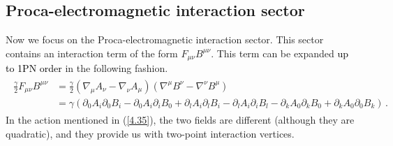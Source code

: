\subsection{Proca-electromagnetic interaction sector}
Now we focus on the Proca-electromagnetic interaction sector. This sector contains an interaction term of the form $F_{\mu\nu}B^{\mu\nu}$. This term can be expanded \textcolor{black}{up to 1PN order }in the following fashion.
\begin{align}
    \begin{split}
  \frac{\gamma}{2} F_{\mu\nu}B^{\mu\nu}&=\frac{\gamma}{2}(\nabla_\mu A_\nu-\nabla_\nu A_\mu)(\nabla^\mu B^\nu-\nabla^\nu B^\mu)\\ &
=\gamma(\partial_0A_i\partial_0B_i-\partial_0A_i\partial_iB_0+\partial_lA_i\partial_lB_i-\partial_lA_i\partial_iB_l-\partial_kA_0\partial_kB_0+\partial_kA_0\partial_0B_k)\,.\label{4.35}
      \end{split}
\end{align}
In the action mentioned in (\ref{4.35}), the two fields are different (although they are quadratic), and they provide us with two-point interaction vertices. 
